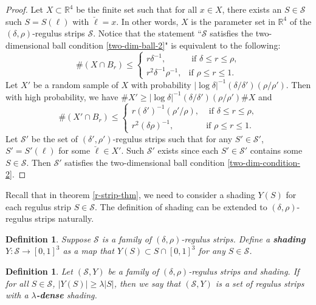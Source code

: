 \documentclass{amsart}%
\numberwithin{equation}{section}
\newtheorem{definition}[theorem]{Definition}
\newcommand{\de}{\delta}
\newcommand{\la}{\lambda}
\newcommand{\cs}{\mathcal S}
\newcommand{\ZR}{\mathbb{R}}
\newcommand{\1}{\mathbbm{1}}
\begin{document}
\begin{proof}

Let $X\subset\ZR^4$ be the finite set such that for all $x\in X$, there exists an $S\in\cs$ such $S=S(\ell)$ with $\breve\ell=x$.
In other words, $X$ is the parameter set in $\ZR^4$ of the $(\de,\rho)$-regulus strips $\cs$. 
Notice that the statement ``$\cs$ satisfies the two-dimensional ball condition \eqref{two-dim-ball-2}" is equivalent to the following:
\begin{equation}
    \#(X\cap B_r)\leq \left\{\begin{array}{lr}
    r\de^{-1},     &\text{ if }\de\leq r\leq\rho,\\
    r^2\de^{-1}\rho^{-1},     &\text{if } \rho\leq r\leq 1.
    \end{array}
    \right.
\end{equation}
Let $X'$ be a random sample of $X$ with probability $|\log\de|^{-1}(\de/\de')(\rho/\rho')$. Then with high probability, we have $\#X'\geq |\log\de|^{-1}(\de/\de')(\rho/\rho')\#X$ and 
\begin{equation}
    \#(X'\cap B_r)\leq \left\{\begin{array}{lr}
    r(\de')^{-1}(\rho'/\rho),     &\text{ if }\de\leq r\leq\rho,\\
    r^2(\de\rho)^{-1},     &\text{if } \rho\leq r\leq 1.
    \end{array}
    \right. 
\end{equation}
Let $\cs'$ be the set of $(\de',\rho')$-regulus strips such that for any $S'\in\cs'$, $S'=S'(\ell)$ for some $\breve\ell\in X'$. 
Such $\cs'$ exists since  each $S'\in\cs'$ contains some $S\in\cs$.
Then $\cs'$ satisfies the two-dimensional ball condition \eqref{two-dim-condition-2}.
\end{proof}

\medskip

Recall that in theorem \ref{r-strip-thm}, we need to consider a shading $Y(S)$ for each regulus strip $S\in\cs$. 
The definition of shading can be extended to $(\de,\rho)$-regulus strips naturally.

\begin{definition}
Suppose $\cs$ is a family of $(\de,\rho)$-regulus strips.
Define a {\bf shading} $Y:\cs\to[0,1]^3$ as a map that $Y(S)\subset S\cap[0,1]^3$ for any $S\in\cs$.
\end{definition}

\begin{definition}
Let $(\cs,Y)$ be a family of $(\de,\rho)$-regulus strips and shading.
If for all $S\in\cs$, $|Y(S)|\geq\la |S|$, then we say that $(\cs, Y)$ is a set of regulus strips with a {\bf $\lambda$-dense} shading. 
\end{definition}
\end{document}
